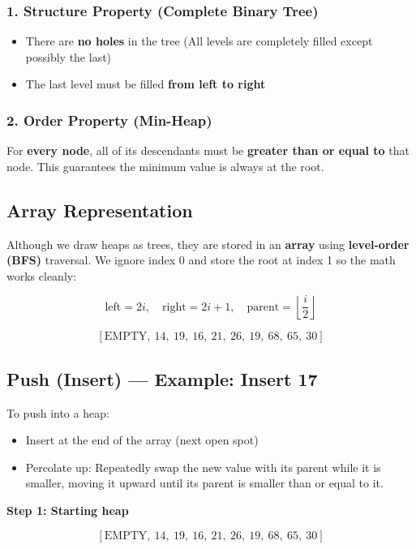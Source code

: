\documentclass{article}
\begin{document}
\subsubsection*{1. Structure Property (Complete Binary Tree)}
\begin{itemize}
  \item There are \textbf{no holes} in the tree (All levels are completely filled except possibly the last)
  \item The last level must be filled \textbf{from left to right}
\end{itemize}

\subsubsection*{2. Order Property (Min-Heap)}
For \textbf{every node}, all of its descendants must be \textbf{greater than or equal to} that node.  
This guarantees the minimum value is always at the root.

\subsection{Array Representation}

Although we draw heaps as trees, they are stored in an \textbf{array} using \textbf{level-order (BFS)} traversal.  
We ignore index 0 and store the root at index 1 so the math works cleanly:

\[
\text{left} = 2i, \quad \text{right} = 2i + 1, \quad \text{parent} = \left\lfloor \frac{i}{2} \right\rfloor
\]

\[
[\text{EMPTY},\ 14,\ 19,\ 16,\ 21,\ 26,\ 19,\ 68,\ 65,\ 30]
\]

\subsection{Push (Insert) --- Example: Insert 17}

To push into a heap:
\begin{itemize}
  \item Insert at the end of the array (next open spot)
  \item Percolate up: Repeatedly swap the new value with its parent while it is smaller, moving it upward until its parent is smaller than or equal to it.
\end{itemize}

\textbf{Step 1: Starting heap}

\[
[\text{EMPTY},\ 14,\ 19,\ 16,\ 21,\ 26,\ 19,\ 68,\ 65,\ 30]
\]
\end{document}
